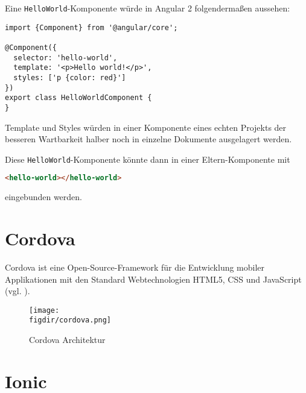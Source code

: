 Eine \texttt{HelloWorld}-Komponente würde in Angular 2 folgendermaßen aussehen:
\begin{codebox}
\begin{lstlisting}[style=typescript]
import {Component} from '@angular/core';

@Component({
  selector: 'hello-world',
  template: '<p>Hello world!</p>',
  styles: ['p {color: red}']
})
export class HelloWorldComponent {
}
\end{lstlisting}
\end{codebox}

Template und Styles würden in einer Komponente eines echten Projekts der besseren Wartbarkeit halber noch in einzelne Dokumente ausgelagert werden.

Diese \texttt{HelloWorld}-Komponente könnte dann in einer Eltern-Komponente mit
\begin{codebox}
\begin{lstlisting}[language=HTML]
<hello-world></hello-world>
\end{lstlisting}
\end{codebox}
eingebunden werden.

\section{Cordova}

Cordova ist eine Open-Source-Framework für die Entwicklung mobiler Applikationen mit den Standard Webtechnologien HTML5, CSS und JavaScript (vgl. \cite{cordova}).

\begin{figure}[htb]
\centering
\caption{Cordova Architektur}
\label{fig:netzabdeckung}
\texttt{[image: \\figdir/cordova.png]}
\end{figure}

\section{Ionic}












